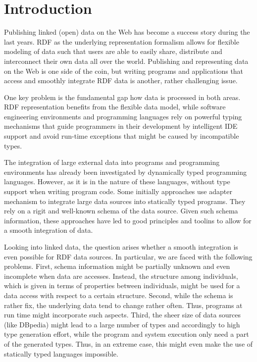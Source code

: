 \documentclass{llncs} %
\begin{document}
\section{Introduction}
\label{sec:intro}


Publishing linked (open) data on the Web has become a success story during the last years.
RDF as the underlying representation formalism allows for flexible modeling of data such that
users are able to easily share, distribute and interconnect their own data all over the world.
Publishing and representing data on the Web is one side of the coin, but writing programs
and applications that access and smoothly integrate RDF data  is another, rather challenging issue.

One key problem is the fundamental gap how data is processed in both areas.
RDF representation benefits from the flexible data model,
while software engineering environments and programming languages rely on powerful typing mechanisms
that guide programmers in their development by intelligent IDE support
and avoid run-time exceptions that might be caused by incompatible types.


The integration of large external data into programs and programming environments
has already been investigated by dynamically typed programming languages.
However, as it is in the nature of these languages, without type support when writing program code.
Some initially approaches use adapter mechanism to integrate large data sources into statically
typed programs. They rely on a rigit and well-known schema of the data source.
Given such schema information, these approaches have led to good principles and toolins to
allow for a smooth integration of data.

Looking into linked data, the question arises whether
a smooth integration is even possible for RDF data sources.
In particular, we are faced with the following problems.
First, schema information might be partially unknown and even incomplete when data are accesses.
Instead, the structure among individuals, which is given in terms of properties between individuals,
might be used for a data access with respect to a certain structure.
Second, while the schema is rather fix, the underlying data tend to change rather often.
Thus, programs at run time might incorporate such aspects.
Third, the sheer size of data sources (like DBpedia)  might lead to a large number of types
and accordingly to high type generation effort, while the program and system execution
only need a part of the generated types.
Thus, in an extreme case, this might even make the use of statically typed languages impossible.
\end{document}
